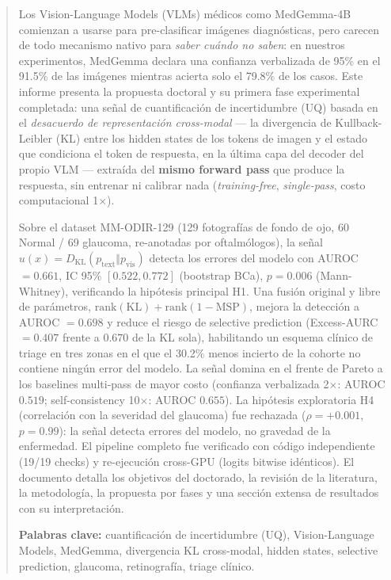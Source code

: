 \documentclass[12pt,a4paper]{article}
\newcommand{\pvis}{p_{\mathrm{vis}}}
\newcommand{\ptext}{p_{\mathrm{text}}}
\newcommand{\ux}{u(x)}
\newcommand{\KL}{D_{\mathrm{KL}}}
\begin{document}
\begin{abstract}
\noindent
Los Vision-Language Models (VLMs) médicos como MedGemma-4B comienzan a
usarse para pre-clasificar imágenes diagnósticas, pero carecen de todo
mecanismo nativo para \emph{saber cuándo no saben}: en nuestros
experimentos, MedGemma declara una confianza verbalizada de 95\% en el
91.5\% de las imágenes mientras acierta solo el 79.8\% de los casos. Este
informe presenta la propuesta doctoral y su primera fase experimental
completada: una señal de cuantificación de incertidumbre (UQ) basada en el
\emph{desacuerdo de representación cross-modal} --- la divergencia de
Kullback-Leibler (KL) entre los hidden states de los tokens de imagen y el
estado que condiciona el token de respuesta, en la última capa del decoder
del propio VLM --- extraída del \textbf{mismo forward pass} que produce la
respuesta, sin entrenar ni calibrar nada (\emph{training-free},
\emph{single-pass}, costo computacional 1$\times$).

Sobre el dataset MM-ODIR-129 (129 fotografías de fondo de ojo, 60 Normal /
69 glaucoma, re-anotadas por oftalmólogos), la señal
$\ux = \KL(\ptext \Vert \pvis)$ detecta los errores del modelo con
AUROC $= 0.661$, IC 95\% $[0.522, 0.772]$ (bootstrap BCa), $p = 0.006$
(Mann-Whitney), verificando la hipótesis principal H1. Una fusión original
y libre de parámetros, $\mathrm{rank}(\mathrm{KL}) +
\mathrm{rank}(1-\mathrm{MSP})$, mejora la detección a AUROC $= 0.698$ y
reduce el riesgo de selective prediction (Excess-AURC $= 0.407$ frente a
$0.670$ de la KL sola), habilitando un esquema clínico de triage en tres
zonas en el que el 30.2\% menos incierto de la cohorte no contiene ningún
error del modelo. La señal domina en el frente de Pareto a los baselines
multi-pass de mayor costo (confianza verbalizada 2$\times$: AUROC $0.519$;
self-consistency 10$\times$: AUROC $0.655$). La hipótesis exploratoria H4
(correlación con la severidad del glaucoma) fue rechazada
($\rho = +0.001$, $p = 0.99$): la señal detecta errores del modelo, no
gravedad de la enfermedad. El pipeline completo fue verificado con código
independiente (19/19 checks) y re-ejecución cross-GPU (logits bitwise
idénticos). El documento detalla los objetivos del doctorado, la revisión
de la literatura, la metodología, la propuesta por fases y una sección
extensa de resultados con su interpretación.

\medskip
\noindent\textbf{Palabras clave:} cuantificación de incertidumbre (UQ),
Vision-Language Models, MedGemma, divergencia KL cross-modal, hidden
states, selective prediction, glaucoma, retinografía, triage clínico.
\end{abstract}
\end{document}
